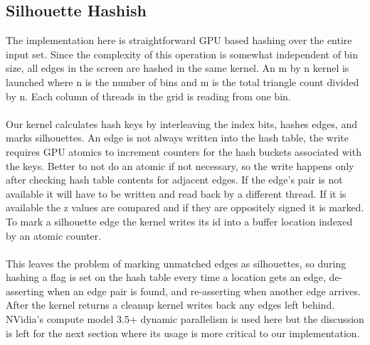 \documentclass[review]{acmsiggraph}
\begin{document}
\subsection{Silhouette Hashish}
The implementation here is straightforward GPU based hashing over the entire input set. Since the complexity of this operation is somewhat independent of bin size, all edges in the screen are hashed in the same kernel. An m by n kernel is launched where n is the number of bins and m is the total triangle count divided by n. Each column of threads in the grid is reading from one bin.
\\\\
Our kernel calculates hash keys by interleaving the index bits, hashes edges, and marks silhouettes. An edge is not always written into the hash table, the write requires GPU atomics to increment counters for the hash buckets associated with the keys. Better to not do an atomic if not necessary, so the write happens only after checking hash table contents for adjacent edges. If the edge’s pair is not available it will have to be written and read back by a different thread. If it is available the z values are compared and if they are oppositely signed it is marked. To mark a silhouette edge the kernel writes its id into a buffer location indexed by an atomic counter. 
\\\\
This leaves the problem of marking unmatched edges as silhouettes, so during hashing a flag is set on the hash table every time a location gets an edge, de-asserting when an edge pair is found, and re-asserting when another edge arrives. After the kernel returns a cleanup kernel writes back any edges left behind. NVidia’s compute model 3.5+ dynamic parallelism is used here but the discussion is left for the next section where its usage is more critical to our implementation.
\end{document}
